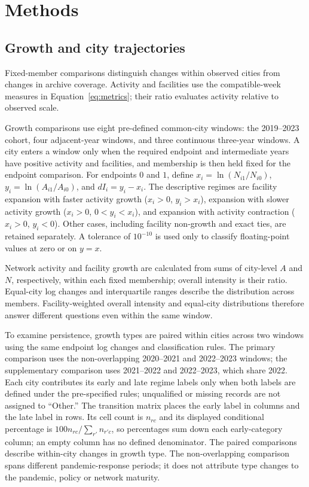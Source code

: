 \section{Methods}

\subsection{Growth and city trajectories}
Fixed-member comparisons distinguish changes within observed cities from changes in archive coverage. Activity and facilities use the compatible-week measures in Equation~\eqref{eq:metrics}; their ratio evaluates activity relative to observed scale.

Growth comparisons use eight pre-defined common-city windows: the 2019--2023 cohort, four adjacent-year windows, and three continuous three-year windows.  A city enters a window only when the required endpoint and intermediate years have positive activity and facilities, and membership is then held fixed for the endpoint comparison.  For endpoints $0$ and $1$, define $x_i=\ln(N_{i1}/N_{i0})$, $y_i=\ln(A_{i1}/A_{i0})$, and $dI_i=y_i-x_i$.  The descriptive regimes are facility expansion with faster activity growth ($x_i>0$, $y_i>x_i$), expansion with slower activity growth ($x_i>0$, $0<y_i<x_i$), and expansion with activity contraction ($x_i>0$, $y_i<0$).  Other cases, including facility non-growth and exact ties, are retained separately.  A tolerance of $10^{-10}$ is used only to classify floating-point values at zero or on $y=x$.

Network activity and facility growth are calculated from sums of city-level $A$ and $N$, respectively, within each fixed membership; overall intensity is their ratio. Equal-city log changes and interquartile ranges describe the distribution across members. Facility-weighted overall intensity and equal-city distributions therefore answer different questions even within the same window.

To examine persistence, growth types are paired within cities across two windows using the same endpoint log changes and classification rules.  The primary comparison uses the non-overlapping 2020--2021 and 2022--2023 windows; the supplementary comparison uses 2021--2022 and 2022--2023, which share 2022.  Each city contributes its early and late regime labels only when both labels are defined under the pre-specified rules; unqualified or missing records are not assigned to ``Other.''  The transition matrix places the early label in columns and the late label in rows.  Its cell count is $n_{rc}$ and its displayed conditional percentage is $100n_{rc}/\sum_{r'}n_{r'c}$, so percentages sum down each early-category column; an empty column has no defined denominator.  The paired comparisons describe within-city changes in growth type. The non-overlapping comparison spans different pandemic-response periods; it does not attribute type changes to the pandemic, policy or network maturity.

